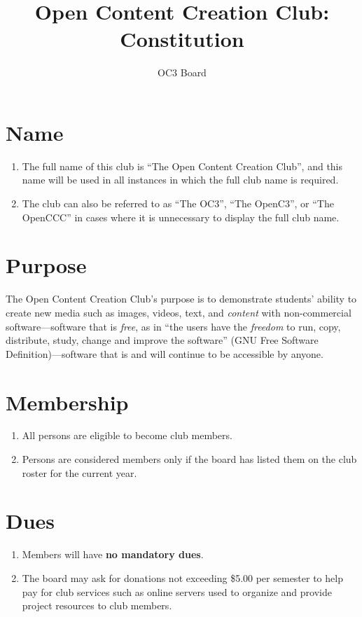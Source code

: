 \documentclass[10pt,letterpaper]{article}
\author{OC3 Board}
\title{Open Content Creation Club: Constitution}
\begin{document}
	\maketitle
	
	\section{Name}
	\begin{enumerate}[label=(\alph*)]
		\item The full name of this club is ``The Open Content Creation Club'', and this name will be used in all instances in which the full club name is required.
		\item The club can also be referred to as ``The OC3'', ``The OpenC3'', or ``The OpenCCC'' in cases where it is unnecessary to display the full club name.
	\end{enumerate}
	
	\section{Purpose}
	The Open Content Creation Club's purpose is to demonstrate students' ability to create new media such as images, videos, text, and \emph{content} with non-commercial software---software that is \emph{free}, as in ``the users have the \emph{freedom} to run, copy, distribute, study, change and improve the software'' (GNU Free Software Definition)---software that is and will continue to be accessible by anyone.
	
	\section{Membership}
	\begin{enumerate}[label=(\alph*)]
		\item All persons are eligible to become club members.
		\item Persons are considered members only if the board has listed them on the club roster for the current year.
	\end{enumerate}
	
	\section{Dues}
	\begin{enumerate}[label=(\alph*)]
		\item Members will have \textbf{no mandatory dues}.
		\item The board may ask for donations not exceeding \$5.00 per semester to help pay for club services such as online servers used to organize and provide project resources to club members.
	\end{enumerate}
	
\end{document}
